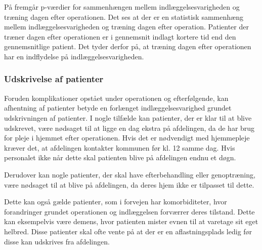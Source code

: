 \noindent 
På  fremgår p-værdier for sammenhængen mellem indlæggelsesvarigheden og træning dagen efter operationen. Det ses at der er en statistisk sammenhæng mellem indlæggelsesvarigheden og træning dagen efter operation. Patienter der træner dagen efter operationen er i gennemsnit indlagt kortere tid end den gennemsnitlige patient. Det tyder derfor på, at træning dagen efter operationen har en indflydelse på indlæggelsesvarigheden. 


\subsubsection{Udskrivelse af patienter}
Foruden komplikationer opstået under operationen og efterfølgende, kan afhentning af patienter betyde en forlænget indlæggelsesvarighed grundet udskrivningen af patienter. I nogle tilfælde kan patienter, der er klar til at blive udskrevet, være nødsaget til at ligge en dag ekstra på afdelingen, da de har brug for pleje i hjemmet efter operationen. Hvis det er nødvendigt med hjemmepleje kræver det, at afdelingen kontakter kommunen før kl. 12 samme dag. Hvis personalet ikke når dette skal patienten blive på afdelingen endnu et døgn. 

Derudover kan nogle patienter, der skal have efterbehandling eller genoptræning, være nødsaget til at blive på afdelingen, da deres hjem ikke er tilpasset til dette. 

Dette kan også gælde patienter, som i forvejen har komorbiditeter, hvor forandringer grundet operationen og indlæggelsen forværrer deres tilstand. Dette kan eksempelvis være demens, hvor patienten mister evnen til at varetage sit eget helbred. Disse patienter skal ofte vente på at der er en aflastningsplads ledig før disse kan udskrives fra afdelingen. 


